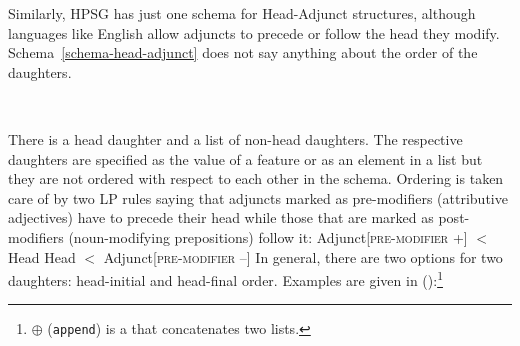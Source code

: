 \documentclass[output=paper
                ,modfonts
                ,nonflat
	        ,collection
	        ,collectionchapter
	        ,collectiontoclongg
 	        ,biblatex
                ,babelshorthands
                ,newtxmath
                ,draftmode
                ,colorlinks, citecolor=brown
]{./langsci/langscibook}
\begin{document}
Similarly, HPSG has just one schema for Head-Adjunct structures, although languages like
English allow adjuncts to precede or follow the head they modify. Schema~\ref{schema-head-adjunct} does not say anything
about the order of the daughters.
\begin{schema}
\label{schema-head-adjunct}
 \impl\\
\end{schema}
There is a head daughter and a list of non-head daughters. The respective daughters are specified as
the value of a feature or as an element in a list but they are not ordered with respect to each
other in the schema. Ordering is taken care of by two LP rules saying that adjuncts marked
as pre-modifiers (\eg attributive adjectives) have to precede their head while those that are marked
as post-modifiers (noun-modifying prepositions) follow it:
\eal
\ex Adjunct[\textsc{pre-modifier} +] $<$ Head
\ex Head $<$ Adjunct[\textsc{pre-modifier} --]
\zl
In general, there are two options for two daughters: head-initial and head-final order. Examples are
given in ():\footnote{%
$\oplus$\is{$\oplus$} (\texttt{append}) is a  that concatenates two lists. 
}
\eal
\ex {}
\end{document}
